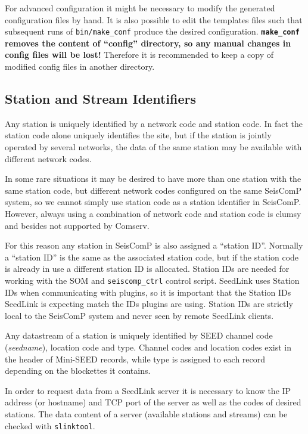 \documentclass[11pt,a4paper,titlepage]{article}
\begin{document}
For advanced configuration it might be necessary to modify the generated
configuration files by hand. It is also possible to edit the templates
files such that subsequent runs of \verb+bin/make_conf+ produce the desired
configuration. \textbf{\texttt{make\_conf} removes the content of
``config'' directory, so any manual changes in config files will be lost!}
Therefore it is recommended to keep a copy of modified config files in
another directory.

\subsection{Station and Stream Identifiers}

Any station is uniquely identified by a network code and station
code. In fact the station code alone uniquely identifies the site, but
if the station is jointly operated by several networks, the data of
the same station may be available with different network codes.

In some rare situations it may be desired to have more than one
station with the same station code, but different network codes
configured on the same SeisComP system, so we cannot simply use
station code as a station identifier in SeisComP. However, always
using a combination of network code and station code is clumsy and
besides not supported by Comserv.

For this reason any station in SeisComP is also assigned a ``station
ID''.  Normally a ``station ID'' is the same as the associated station
code, but if the station code is already in use a different station ID
is allocated. Station IDs are needed for working with the SOM and
\verb+seiscomp_ctrl+ control script. SeedLink uses Station IDs when
communicating with plugins, so it is important that the Station IDs
SeedLink is expecting match the IDs plugins are using. Station IDs are
strictly local to the SeisComP system and never seen by remote
SeedLink clients.

Any datastream of a station is uniquely identified by SEED channel
code (\textit{seedname}), location code and type. Channel codes and
location codes exist in the header of Mini-SEED records, while type is
assigned to each record depending on the blockettes it contains.

In order to request data from a SeedLink server it is necessary to
know the IP address (or hostname) and TCP port of the server as well
as the codes of desired stations.  The data content of a server
(available stations and streams) can be checked with \verb+slinktool+.
\end{document}
